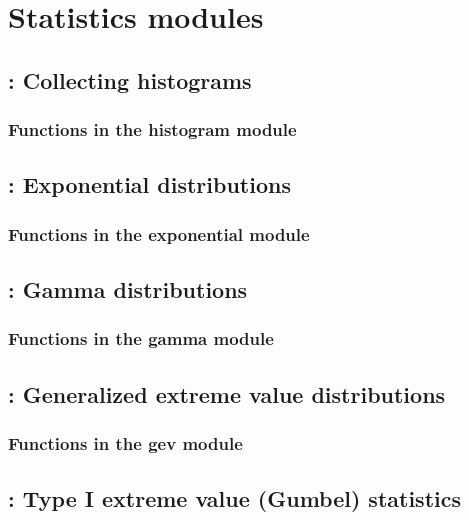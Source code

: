 \documentclass[11pt]{book}
\begin{document}
\newpage
\chapter{Statistics modules}


\newpage
\section{: Collecting histograms}

\subsection{Functions in the histogram module}


\newpage
\section{: Exponential distributions}

\subsection{Functions in the exponential module}


\newpage
\section{: Gamma distributions}

\subsection{Functions in the gamma module}


\newpage
\section{: Generalized extreme value distributions}

\subsection{Functions in the gev module}


\newpage
\section{: Type I extreme value (Gumbel) statistics}

\end{document}

